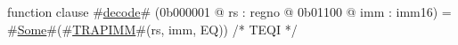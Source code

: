function clause #\hyperref[zdecode]{decode}# (0b000001 @ rs : regno @ 0b01100 @ imm : imm16) =
  #\hyperref[zSome]{Some}#(#\hyperref[zTRAPIMM]{TRAPIMM}#(rs, imm, EQ)) /* TEQI */
